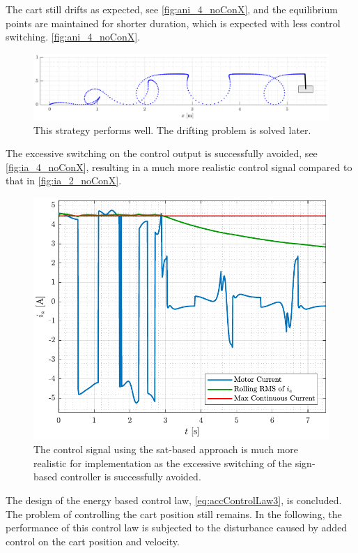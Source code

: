 %
The cart still drifts as expected, see \autoref{fig:ani_4_noConX}, and the equilibrium points are maintained for shorter duration, which is expected with less control switching.
%
\autoref{fig:ani_4_noConX}.
\begin{figure}[H]
  \includegraphics[width=.7\textwidth]{figures/ani_4_noConX}
  \caption{This strategy performs well. The drifting problem is solved later.}
  \label{fig:ani_4_noConX}
\end{figure}
%
The excessive switching on the control output is successfully avoided, see \autoref{fig:ia_4_noConX}, resulting in a much more realistic control signal compared to that in \autoref{fig:ia_2_noConX}.
%
\begin{figure}[H]
  \includegraphics[width=.52\textwidth]{figures/ia_4_noConX}
  \caption{The control signal using the sat-based approach is much more realistic for implementation as the excessive switching of the sign-based controller is successfully avoided.}
  \label{fig:ia_4_noConX}
\end{figure}
%
The design of the energy based control law, \autoref{eq:accControlLaw3}, is concluded. The problem of controlling the cart position still remains. In the following, the performance of this control law is subjected to the disturbance caused by added control on the cart position and velocity.
%
%

